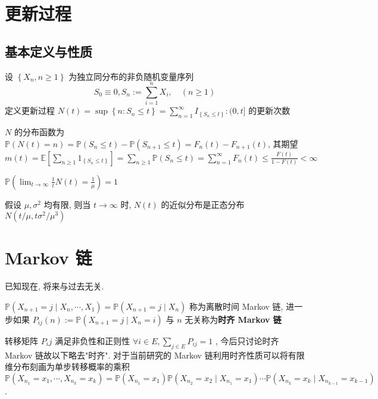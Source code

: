 \documentclass[10pt]{yerbaformat}
\begin{document}
\section{更新过程}
\subsection{基本定义与性质}
\begin{definition}
    设 $\left\{X_{n}, n \geq 1\right\}$ 为独立同分布的非负随机变量序列
    $$
        S_{0} \equiv 0, S_{n}:=\sum_{i=1}^{n} X_{i}, \quad(n \geq 1)
    $$
    定义更新过程 $N(t)=\sup \left\{n: S_{n} \leq t\right\}=\sum_{n=1}^{\infty} I_{\left\{S_{n} \leq t\right\}}:(0, t]$ 的更新次数
\end{definition}

\par $N$ 的分布函数为 $\mathbb{P}(N(t)=n)=\mathbb{P}\left(S_{n} \leq t\right)-\mathbb{P}\left(S_{n+1} \leq t\right)=F_{n}(t)-F_{n+1}(t)$, 其期望 $m(t)=\mathbb{E}\left[\sum_{n \geq 1} 1_{\left\{S_{n} \leq t\right\}}\right]=\sum_{n \geq 1} \mathbb{P}\left(S_{n} \leq t\right)=\sum_{n=1}^{\infty} F_{n}(t)\leq \frac{F(t)}{1-F(t)}<\infty$

\begin{theorem}
    $\mathbb{P}\left(\lim _{t \rightarrow \infty} \frac{1}{t} N(t)=\frac{1}{\mu}\right)=1$
\end{theorem}

\begin{theorem}
    假设 $\mu, \sigma^{2}$ 均有限, 则当 $t \rightarrow \infty$ 时, $N(t)$ 的近似分布是正态分布 $ N\left(t / \mu, t \sigma^{2} / \mu^{3}\right) $
\end{theorem}

\section{Markov 链}

\begin{definition}[无后效性]
    已知现在, 将来与过去无关.
\end{definition}

\begin{definition}
    $\mathbb{P}\left(X_{n+1}=j \mid X_{n}, \cdots, X_{1}\right)=\mathbb{P}\left(X_{n+1}=j \mid X_{n}\right)$ 称为离散时间 Markov 链, 进一步如果 $P_{i j}(n):=\mathbb{P}\left(X_{n+1}=j \mid X_{n}=i\right)$ 与 $n$ 无关称为\textbf{时齐 Markov 链}
\end{definition}

\par 转移矩阵 $P_ij$ 满足非负性和正则性 $\forall i \in E, \sum_{j \in E} P_{i j}=1$ , 今后只讨论时齐 Markov 链故以下略去"时齐". 对于当前研究的 Markov 链利用时齐性质可以将有限维分布刻画为单步转移概率的乘积 $$\mathbb{P}\left(X_{n_{1}}=x_{1}, \cdots, X_{n_{k}}=x_{k}\right)=\mathbb{P}\left(X_{n_{1}}=x_{1}\right) \mathbb{P}\left(X_{n_{2}}=x_{2} \mid X_{n_{1}}=x_{1}\right) \cdots \mathbb{P}\left(X_{n_{k}}=x_{k} \mid X_{n_{k-1}}=x_{k-1}\right)$$.
\end{document}
